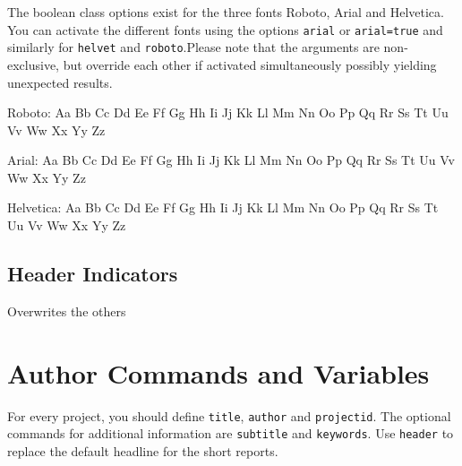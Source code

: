 \documentclass[short,comm,dots]{ipureport}
\begin{document}
The boolean class options exist for the three fonts Roboto, Arial and Helvetica. You can activate the different fonts using the options \texttt{arial} or \texttt{arial=true} and similarly for \texttt{helvet} and \texttt{roboto}.Please note that the arguments are non-exclusive, but override each other if activated simultaneously possibly yielding unexpected results.

\begin{flushright}

{%
\roboto Roboto: Aa Bb Cc Dd Ee Ff Gg Hh Ii Jj Kk Ll Mm Nn Oo Pp Qq Rr Ss Tt Uu Vv Ww Xx Yy Zz}

{\selectfont Arial: Aa Bb Cc Dd Ee Ff Gg Hh Ii Jj Kk Ll Mm Nn Oo Pp Qq Rr Ss Tt Uu Vv Ww Xx Yy Zz}

{\selectfont Helvetica: Aa Bb Cc Dd Ee Ff Gg Hh Ii Jj Kk Ll Mm Nn Oo Pp Qq Rr Ss Tt Uu Vv Ww Xx Yy Zz}

\end{flushright}

\subsection{Header Indicators}
%
%
%
 Overwrites the others
%
\section{Author Commands and Variables}

For every project, you should define \texttt{title}, \texttt{author} and \texttt{projectid}. The optional 
commands for additional information are \texttt{subtitle} and \texttt{keywords}. Use \texttt{header} to replace the default 
headline for the short reports. 



\blinddocument
{}
\blindmathpaper

\end{document}
